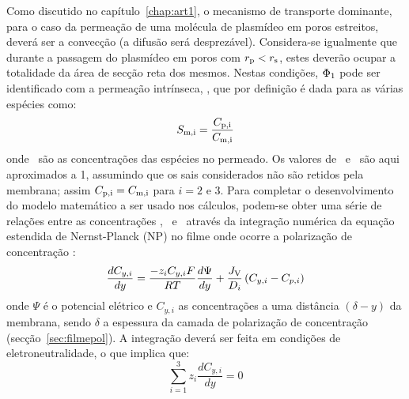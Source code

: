Como discutido no capítulo~\ref{chap:art1}, o mecanismo de transporte dominante, para o caso da permeação de uma molécula de plasmídeo em poros estreitos, deverá ser a convecção (a difusão será desprezável). Considera-se igualmente que durante a passagem do plasmídeo em poros com $r_{\mathrm{p}}<r_{\mathrm{s}}$, estes deverão ocupar a totalidade da área de secção reta dos mesmos. Nestas condições, $\Phi_{1}$ pode ser identificado com a permeação intrínseca, \permmum, que por definição é dada para as várias espécies como:
%
%
\begin{equation}
\label{eq:permeacaointrinsicameu2}
S_{\mathrm{m,i}}=\frac{C_{\mathrm{p,i}}}{C_{\mathrm{m,i}}}
\end{equation}
onde \concpi\ são as concentrações das espécies no permeado. Os valores de \permmdois\ e \permmtres\ são aqui aproximados a 1, assumindo que os sais considerados não são retidos pela membrana; assim $C_{\mathrm{p,i}}=C_{\mathrm{m,i}}$ para $i=2$ e $3$.
Para completar o desenvolvimento do modelo matemático a ser usado nos cálculos, podem-se obter uma série de relações entre as concentrações \concpi, \concmi\ e \concbi\ através da integração numérica da equação estendida de Nernst-Planck (NP) no filme onde ocorre a polarização de concentração \cite{bowen02}:
%
%
\begin{equation}
\label{eq:np}
\frac{dC_{y,i}}{dy}=\frac{-z_{i}C_{y,i}F}{RT}\frac{d\Psi}{dy}+\frac{J_{\mathrm{V}}}{D_{i}}\left(C_{y,i}-C_{p,i}\right)
\end{equation}
onde $\Psi$ é o potencial elétrico e $C_{y,i}$ as concentrações a uma distância $(\delta-y)$ da membrana, sendo $\delta$ a espessura da camada de polarização de concentração (secção~\ref{sec:filmepol}).
%
%
A integração deverá ser feita em condições de eletroneutralidade, o que implica que:
%
\begin{equation}
\label{eq:eletroneutralidade}
\sum_{i=1}^{3} z_{i} \frac{dC_{y,i}}{dy}=0
\end{equation}


